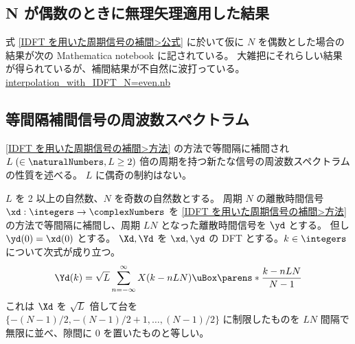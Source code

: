         \subsection{N が偶数のときに無理矢理適用した結果}
            \label{N が偶数のときに無理矢理適用した結果}
            式 \eqref{IDFT を用いた周期信号の補間>公式} に於いて仮に $N$ を偶数とした場合の結果が次の Mathematica notebook に記されている。
            大雑把にそれらしい結果が得られているが、補間結果が不自然に波打っている。\newline
            \href{\currfiledir/calc/Interpolation_with_IDFT/interpolation_with_IDFT_N=even/interpolation_with_IDFT_N=even.nb}{interpolation\_with\_IDFT\_N=even.nb}
        \subsection{等間隔補間信号の周波数スペクトラム}
            \ref{IDFT を用いた周期信号の補間>方法} の方法で等間隔に補間され $L\;(\in\naturalNumbers,L\geq 2)$ 倍の周期を持つ新たな信号の周波数スペクトラムの性質を述べる。
            $L$ に偶奇の制約はない。
            \begin{shadebox}
                $L$ を 2 以上の自然数、$N$ を奇数の自然数とする。
                周期 $N$ の離散時間信号 $\xd:\integers\to\complexNumbers$ を \ref{IDFT を用いた周期信号の補間>方法} の方法で等間隔に補間し、周期 $LN$ となった離散時間信号を $\yd$ とする。
                但し $\yd(0) = \xd(0)$ とする。
                $\Xd,\Yd$ を $\xd,\yd$ の DFT とする。$k\in\integers$ について次式が成り立つ。
                \[ \Yd(k) = \sqrt{L}\sum_{n=-\infty}^{\infty}X(k-nLN)\uBox\parens*{\frac{k-nLN}{N-1}} \]
                これは $\Xd$ を $\sqrt{L}$ 倍して台を $\{-(N-1)/2,-(N-1)/2+1,\dots,(N-1)/2\}$ に制限したものを $LN$ 間隔で無限に並べ、隙間に 0 を置いたものと等しい。
            \end{shadebox}
